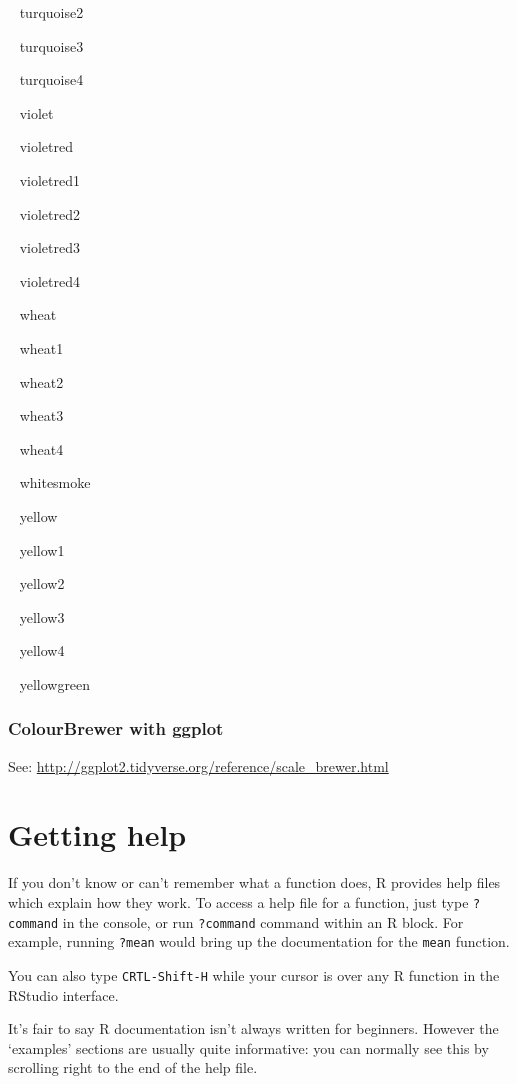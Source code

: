 \documentclass[]{article}
\begin{document}
{~} turquoise2

{~} turquoise3

{~} turquoise4

{~} violet

{~} violetred

{~} violetred1

{~} violetred2

{~} violetred3

{~} violetred4

{~} wheat

{~} wheat1

{~} wheat2

{~} wheat3

{~} wheat4

{~} whitesmoke

{~} yellow

{~} yellow1

{~} yellow2

{~} yellow3

{~} yellow4

{~} yellowgreen

\hypertarget{color-brewer}{%
\subsubsection*{ColourBrewer with ggplot}\label{color-brewer}}

See: \url{http://ggplot2.tidyverse.org/reference/scale_brewer.html}

\hypertarget{getting-help}{%
\section{Getting help}\label{getting-help}}

If you don't know or can't remember what a function does, R provides help files
which explain how they work. To access a help file for a function, just type
\texttt{?command} in the console, or run \texttt{?command} command within an R block. For
example, running \texttt{?mean} would bring up the documentation for the \texttt{mean}
function.

You can also type \texttt{CRTL-Shift-H} while your cursor is over any R function in the
RStudio interface.

It's fair to say R documentation isn't always written for beginners. However the
`examples' sections are usually quite informative: you can normally see this by
scrolling right to the end of the help file.
\end{document}
